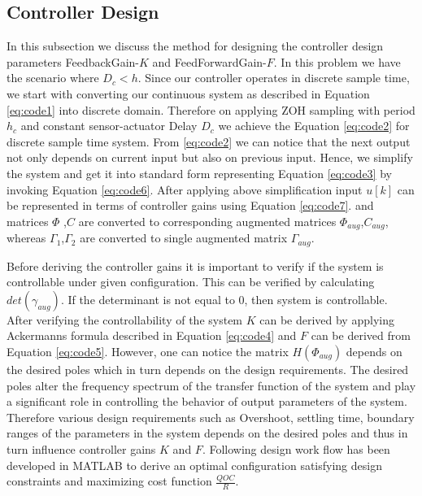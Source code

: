 \subsection{Controller Design}
In this subsection we discuss the method for designing the controller design parameters FeedbackGain-$K$ and FeedForwardGain-$F$. In this problem we have the scenario where $D_c<h$. Since our controller operates in discrete sample time, we start with converting our continuous system as described in Equation  \ref{eq:code1} into discrete domain. Therefore on applying ZOH sampling with period $h_c$ and constant sensor-actuator Delay $D_c$ we achieve the Equation  \ref{eq:code2} for discrete sample time system. From \ref{eq:code2} we can notice that the next output not only depends on current input but also on previous input. Hence, we simplify the system and get it into standard form representing Equation  \ref{eq:code3} by invoking Equation \ref{eq:code6}. After applying above simplification input $u[k]$ can be represented in terms of controller gains using Equation \ref{eq:code7}. 
and matrices $\Phi$ ,$C$ are converted to corresponding augmented matrices $\Phi_{aug}$,$C_{aug}$, whereas $\Gamma_1$,$\Gamma_2$ are converted to single augmented matrix $\Gamma_{aug}$.

  Before deriving the controller gains it is important to verify if the system is controllable under given configuration. This can be verified by calculating $det(\gamma_{aug})$. If the determinant is not equal to 0, then system is controllable. After verifying the controllability of the system $K$ can be derived by applying Ackermanns formula described in Equation \ref{eq:code4} and $F$ can be derived from Equation  \ref{eq:code5}. However, one can notice the matrix $H(\Phi_{aug})$ depends on the desired poles which in turn depends on the design requirements. The desired poles alter the frequency spectrum of the transfer function of the system and play a significant role in controlling the behavior of output parameters of the system. Therefore various design requirements such as Overshoot, settling time, boundary ranges of the parameters in the system depends on the desired poles and thus in turn influence controller gains $K$ and $F$. Following design work flow has been developed in MATLAB to derive an optimal configuration satisfying design constraints and maximizing cost function $\frac{QOC}{R}$.